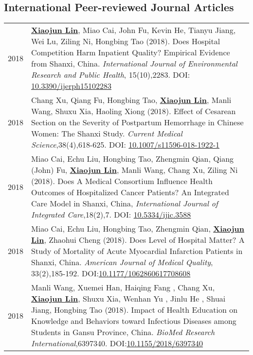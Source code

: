 \documentclass[a4paper,10pt]{article}
\begin{document}
\subsection*{International Peer-reviewed Journal Articles}
\begin{longtable}{r p{13cm}}

2018 & \underline{\textbf{Xiaojun Lin}}, Miao Cai, John Fu, Kevin He, Tianyu Jiang, Wei Lu, Ziling Ni, Hongbing Tao (2018). Does Hospital Competition Harm Inpatient Quality? Empirical Evidence from Shanxi, China. \emph{International Journal of Environmental Research and Public Health}, 15(10),2283. DOI: \href{https://doi.org/10.3390/ijerph15102283}{10.3390/ijerph15102283}\\[5pt]

2018 & Chang Xu, Qiang Fu, Hongbing Tao, \underline{\textbf{Xiaojun Lin}}, Manli Wang, Shuxu Xia, Haoling Xiong (2018). Effect of Cesarean Section on the Severity of Postpartum Hemorrhage in Chinese Women: The Shanxi Study. \emph{Current Medical Science},38(4),618-625. DOI: \href{https://doi.org/10.1007/s11596-018-1922-1}{10.1007/s11596-018-1922-1}\\[5pt]

2018 & Miao Cai, Echu Liu, Hongbing Tao, Zhengmin Qian, Qiang (John) Fu, \underline{\textbf{Xiaojun Lin}}, Manli Wang, Chang Xu, Ziling Ni (2018). Does A Medical Consortium Influence Health Outcomes of Hospitalized Cancer Patients? An Integrated Care Model in Shanxi, China, \emph{International Journal of Integrated Care},18(2),7. DOI: \href{https://doi.org/10.5334/ijic.3588}{10.5334/ijic.3588}\\[5pt]

2018 & Miao Cai, Echu Liu, Hongbing Tao, Zhengmin Qian, \underline{\textbf{Xiaojun Lin}}, Zhaohui Cheng (2018). Does Level of Hospital Matter? A Study of Mortality of Acute Myocardial Infarction Patients in Shanxi, China. \emph{American Journal of Medical Quality}, 33(2),185-192. DOI:\href{https://doi.org/10.1177/1062860617708608}{10.1177/1062860617708608}\\[5pt] 

2018 & Manli Wang, Xuemei Han, Haiqing Fang , Chang Xu, \underline{\textbf{Xiaojun Lin}}, Shuxu Xia, Wenhan Yu , Jinlu He , Shuai Jiang, Hongbing Tao (2018). Impact of Health Education on Knowledge and Behaviors toward Infectious Diseases among Students in Gansu Province, China. \emph{BioMed Research International},6397340. DOI:\href{https://doi.org/10.1155/2018/6397340}{10.1155/2018/6397340}\\[5pt]


\end{longtable}
\end{document}
